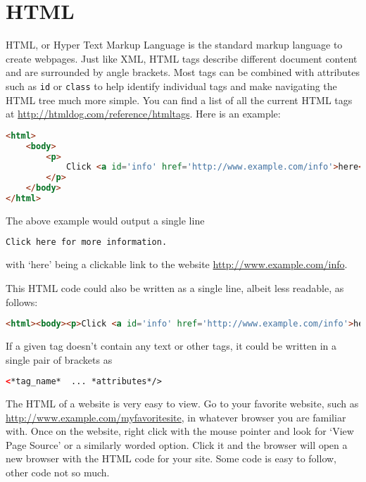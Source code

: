 \label{lab:BS_scraping}

\section*{HTML}
HTML, or Hyper Text Markup Language is the standard markup language to create webpages.
Just like XML, HTML tags describe different document content and are surrounded by angle brackets.
Most tags can be combined with attributes such as \lstinline[language=html]{id} or \lstinline[language=html]{class} to help identify individual tags and make navigating the HTML tree much more simple.
You can find a list of all the current HTML tags at \url{http://htmldog.com/reference/htmltags}.
Here is an example:
\begin{lstlisting}[language=HTML]
<html>
    <body>
        <p>
            Click <a id='info' href='http://www.example.com/info'>here</a> for more information.
        </p>
    </body>
</html>
\end{lstlisting}

The above example would output a single line
\begin{lstlisting}[language=HTML]
Click here for more information.
\end{lstlisting}
with `here' being a clickable link to the website \url{http://www.example.com/info}.

This HTML code could also be written as a single line, albeit less readable, as follows:
\begin{lstlisting}[language=HTML]
<html><body><p>Click <a id='info' href='http://www.example.com/info'>here</a> for more information.</p></body></html>
\end{lstlisting}
If a given tag doesn't contain any text or other tags, it could be written in a single pair of brackets as
\begin{lstlisting}[language=HTML]
<*tag_name*  ... *attributes*/>
\end{lstlisting}

The HTML of a website is very easy to view.
Go to your favorite website, such as \url{http://www.example.com/myfavoritesite}, in whatever browser you are familiar with.
Once on the website, right click with the mouse pointer and look for `View Page Source' or a similarly worded option.
Click it and the browser will open a new browser with the HTML code for your site.
Some code is easy to follow, other code not so much.

